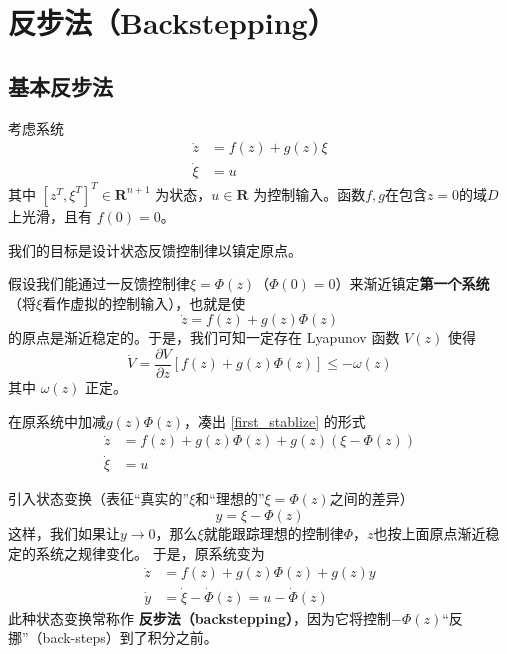 \section{反步法（Backstepping）}\label{5Dref}
\subsection{基本反步法}
考虑系统
\begin{equation}
    \begin{aligned}
  \dot{z} & = f (z) + g (z) \xi\\
  \dot{\xi} & = u
\end{aligned}\label{Sys:backstep:basic:original}
\end{equation}
其中 $[z^T, \xi^T]^T \in \mathbf{R}^{n + 1}$ 为状态，$u \in
\mathbf{R}$ 为控制输入。函数$f, g$在包含$z = 0$的域$D$上光滑，且有 $f (0) = 0$。

我们的目标是设计状态反馈控制律以镇定原点。%

假设我们能通过一反馈控制律$\xi = \Phi (z)$（$\Phi (0) = 0$）来渐近镇定{\bf 第一个系统}（将$\xi$看作虚拟的控制输入），也就是使
\begin{equation}
    \dot{z} = f (z) + g (z) \Phi (z) \label{first_stablize}
\end{equation}
的原点是渐近稳定的。于是，我们可知一定存在 Lyapunov 函数 $V (z)$ 使得
\[ \dot{V} = \frac{\partial V}{\partial z} [f (z) + g (z) \Phi (z)] \leq -
   \omega (z) \]
其中 $\omega (z)$ 正定。

在原系统中加减$g (z) \Phi (z)$，凑出 \eqref{first_stablize} 的形式
\begin{equation}
   \begin{aligned}
  \dot{z} & = f (z) + g (z) \Phi (z) + g (z) (\xi - \Phi (z))\\
  \dot{\xi} & = u
\end{aligned} \label{Sys:backstep:basic:control}
\end{equation}

引入状态变换（表征“真实的”$\xi$和“理想的”$\xi=\Phi (z)$之间的差异）
\[ y = \xi - \Phi (z) \]
这样，我们如果让$y\to 0$，那么$\xi$就能跟踪理想的控制律$\Phi$，$z$也按上面原点渐近稳定的系统之规律变化。
于是，原系统变为
\begin{equation}
    \begin{aligned}
  \dot{z} & = f (z) + g (z) \Phi (z) + g (z) y\\
  \dot{y} & = \dot{\xi}-\dot{\Phi} (z) = u - \dot{\Phi} (z)
\end{aligned}\label{Sys:backstep:basic:backstep}
\end{equation}
此种状态变换常称作 {\textbf{反步法（backstepping）}}，因为它将控制$- \Phi (z)$“反挪”（back-steps）到了积分之前。

